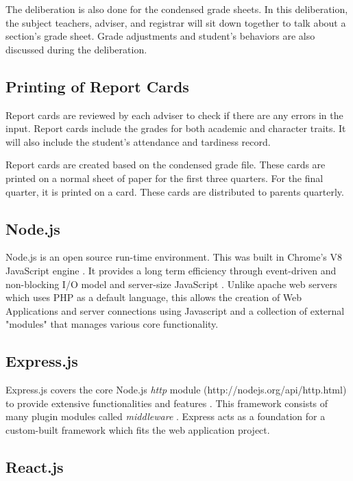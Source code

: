 \documentclass[11pt,a4paper,titlepage]{article}
\begin{document}
The deliberation is also done for the condensed grade sheets. In this deliberation, the subject teachers, adviser, and registrar will sit down together to talk about a section's grade sheet. Grade adjustments and student's behaviors are also discussed during the deliberation.

\subsection{Printing of Report Cards}

Report cards are reviewed by each adviser to check if there are any errors in the input. Report cards include the grades for both academic and character traits. It will also include the student's attendance and tardiness record.

Report cards are created based on the condensed grade file. These cards are printed on a normal sheet of paper for the first three quarters. For the final quarter, it is printed on a card. These cards are distributed to parents quarterly.

\subsection{Node.js}

Node.js is an open source run-time environment. This was built in Chrome's V8 JavaScript engine \cite{Shah}. It provides a long term efficiency through event-driven and non-blocking I/O model and server-size JavaScript \cite{Joyent}. Unlike apache web servers which uses PHP as a default language, this allows the creation of Web Applications and server connections using Javascript and a collection of external "modules" that manages various core functionality.  

\subsection{Express.js}

 Express.js covers the core Node.js \textit{http} module (http://nodejs.org/api/http.html) to provide extensive functionalities and features \cite{Mardan}. This framework consists of many plugin modules called \textit{middleware} \cite{Mardan}. Express acts as a foundation for a custom-built framework which fits the web application project.

\subsection{React.js}
\end{document}
